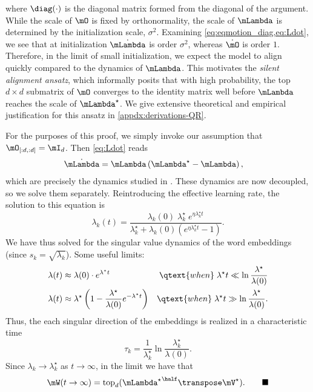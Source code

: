 where $\diag(\cdot)$ is the diagonal matrix formed from the diagonal of the argument. While the scale of $\O$ is fixed by orthonormality, the scale of $\L$ is determined by the initialization scale, $\sigma^2$. Examining \cref{eq:eqmotion_diag,eq:Ldot}, we see that at initialization $\dot\L$ is order $\sigma^2$, whereas $\dot\O$ is order $1$. Therefore, in the limit of small initialization, we expect the model to align quickly compared to the dynamics of $\L$. This motivates the \textit{silent alignment ansatz}, which informally posits that with high probability, the top $d \times d$ submatrix of $\O$ converges to the identity matrix well before $\L$ reaches the scale of $\Lstar$. We give extensive theoretical and empirical justification for this ansatz in \cref{appdx:derivations-QR}.

For the purposes of this proof, we simply invoke our assumption that $\O_{[:d,:d]}=\mI_d$. Then \cref{eq:Ldot} reads
\begin{align}
    \dot\L &= \L\left(\Lstar - \L\right),
\end{align}
which are precisely the dynamics studied in \cite{saxe2014exact}. These dynamics are now decoupled, so we solve them separately. Reintroducing the effective learning rate, the solution to this equation is
\begin{equation}
    \lambda_k(t) = \frac{\lambda_k(0) \; \lambda_k^\star \; e^{\eta\lambda_k^\star t}}{\lambda_k^\star + \lambda_k(0)\left(e^{\eta\lambda_k^\star t} -1\right)}.
\end{equation}
We have thus solved for the singular value dynamics of the word embeddings (since $s_k=\sqrt{\lambda_k}$). Some useful limits:
\begin{align}
    \lambda(t) &\approx \lambda(0) \cdot e^{\lambda^\star t} &\qtext{when}\; \lambda^\star t \ll \ln \frac{\lambda^\star}{\lambda(0)} \\
    \lambda(t) &\approx \lambda^\star \left(1-\frac{\lambda^\star}{\lambda(0)}e^{-\lambda^\star t}\right) &\qtext{when}\; \lambda^\star t \gg \ln \frac{\lambda^\star}{\lambda(0)}.
\end{align}
Thus, the each singular direction of the embeddings is realized in a characteristic time
\begin{equation}
    \tau_k = \frac{1}{\lambda_k^\star}\ln \frac{\lambda_k^\star}{\lambda(0)}.
\end{equation}
Since $\lambda_k\to\lambda_k^\star$ as $t\to\infty$, in the limit we have that
\begin{equation}
    \mW(t\to\infty) = \mathrm{top}_d({\Lstar}^\half \T{\mV^\star}). \qquad \blacksquare
\end{equation}

